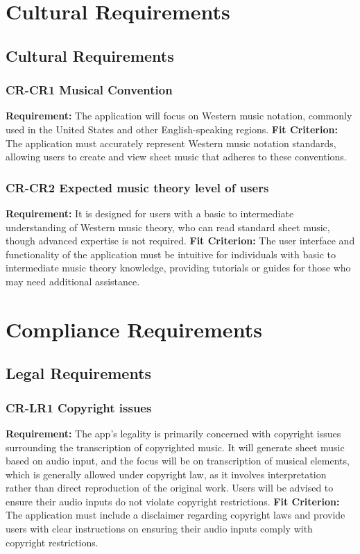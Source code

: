 \documentclass[12pt]{article}
\begin{document}
\section{Cultural Requirements}
\subsection{Cultural Requirements}

\subsubsection*{CR-CR1 Musical Convention} \label{CR-CR1}
\textbf{Requirement: }The application will focus on Western music notation, commonly used in the United States and other English-speaking regions. 
\textbf{Fit Criterion:} The application must accurately represent Western music notation standards, allowing users to create and view sheet music that adheres to these conventions.

\subsubsection*{CR-CR2 Expected music theory level of users} \label{CR-CR2}
\textbf{Requirement: }It is designed for users with a basic to intermediate understanding of Western music theory, who can read standard sheet music, though advanced expertise is not required.
\textbf{Fit Criterion:} The user interface and functionality of the application must be intuitive for individuals with basic to intermediate music theory knowledge, providing tutorials or guides for those who may need additional assistance.

\section{Compliance Requirements}
\subsection{Legal Requirements}

\subsubsection*{CR-LR1 Copyright issues} \label{CR-LR1}
\textbf{Requirement: }The app’s legality is primarily concerned with copyright issues surrounding the transcription of copyrighted music. It will generate sheet music based on audio input, and the focus will be on transcription of musical elements, which is generally allowed under copyright law, as it involves interpretation rather than direct reproduction of the original work. Users will be advised to ensure their audio inputs do not violate copyright restrictions.
\textbf{Fit Criterion:} The application must include a disclaimer regarding copyright laws and provide users with clear instructions on ensuring their audio inputs comply with copyright restrictions.
\end{document}
